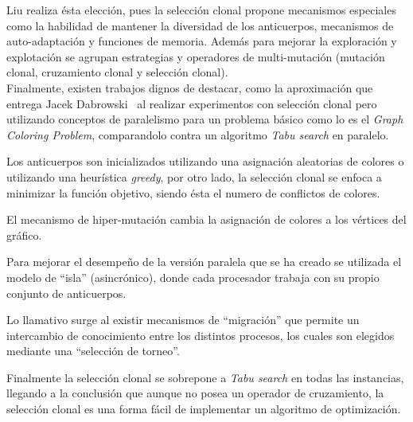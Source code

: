 Liu realiza ésta elección, pues la selección clonal propone mecanismos especiales como la habilidad de mantener la diversidad
de los anticuerpos, mecanismos de auto-adaptación y funciones de memoria. Además para mejorar la exploración y explotación
se agrupan estrategias y operadores de multi-mutación (mutación clonal, cruzamiento clonal y selección clonal).\\


Finalmente, existen trabajos dignos de destacar, como la aproximación que entrega Jacek Dabrowski~\cite{graph}
al realizar experimentos con selección clonal pero utilizando conceptos de paralelismo para un problema básico como lo es
el \emph{Graph Coloring Problem}, comparandolo contra un algoritmo \emph{Tabu search} en paralelo.

Los anticuerpos son inicializados utilizando una asignación aleatorias de colores o utilizando una heurística \emph{greedy},
por otro lado, la selección clonal se enfoca a minimizar la función objetivo, siendo ésta el numero de conflictos de colores.

El mecanismo de hiper-mutación cambia la asignación de colores a los vértices del gráfico.

Para mejorar el desempeño de la versión paralela que se ha creado se utilizada el modelo de ``isla'' (asincrónico),
donde cada procesador trabaja con su propio conjunto de anticuerpos.

Lo llamativo surge al existir mecanismos de ``migración'' que permite un intercambio de conocimiento entre los 
distintos procesos, los cuales son elegidos mediante una ``selección de torneo''.

Finalmente la selección clonal se sobrepone a \emph{Tabu search} en todas las instancias,
llegando a la conclusión que aunque no posea un operador de cruzamiento, la selección clonal
es una forma fácil de implementar un algoritmo de optimización.

